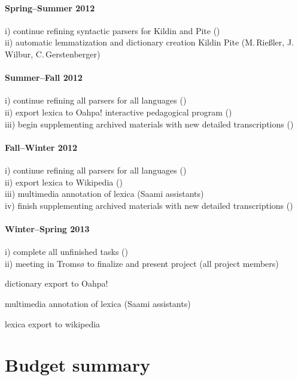 \documentclass[a4paper,12pt]{article}
\begin{document}
{{{{\paragraph{Spring–Summer 2012}
i) continue refining syntactic parsers for Kildin and Pite ()\\
ii) automatic lemmatization and dictionary creation Kildin Pite (M.\,Rießler, J.\,Wilbur, C.\,Gerstenberger)

\paragraph{Summer–Fall 2012}
i) continue refining all parsers for all languages ()\\
ii) export lexica to Oahpa! interactive pedagogical program ()\\
iii) begin supplementing archived materials with new detailed transcriptions ()

\paragraph{Fall–Winter 2012}
i) continue refining all parsers for all languages ()\\
ii) export lexica to Wikipedia ()\\
iii) multimedia annotation of lexica (Saami assistants)\\
iv) finish supplementing archived materials with new detailed transcriptions ()

\paragraph{Winter–Spring 2013}
i) complete all unfinished tasks ()\\
ii) meeting in Tromsø to finalize and present project (all project members)




dictionary export to Oahpa!

multimedia annotation of lexica (Saami assistants)

lexica export to wikipedia



\section{Budget summary}

}}}}
\end{document}
